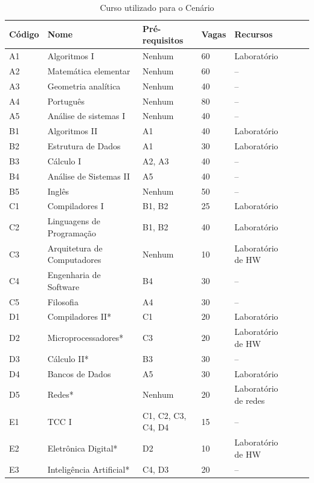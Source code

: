 \begin{table}\centering\footnotesize
  \caption{Curso utilizado para o Cenário}
  \begin{tabular*}{1\textwidth}{@{}lllllll@{}}
    \toprule
    Código & Nome & Pré-requisitos & Vagas & Recursos \\
    \midrule
    A1 & Algoritmos I           & Nenhum & 60 & Laboratório \\
    A2 & Matemática elementar   & Nenhum & 60 & -- \\
    A3 & Geometria analítica    & Nenhum & 40 & -- \\
    A4 & Português              & Nenhum & 80 & -- \\
    A5 & Análise de sistemas I  & Nenhum & 40 & -- \\
    \midrule
    B1 & Algoritmos II          & A1 & 40 & Laboratório \\
    B2 & Estrutura de Dados     & A1 & 30 & Laboratório \\
    B3 & Cálculo I              & A2, A3 & 40 & -- \\
    B4 & Análise de Sistemas II & A5 & 40 & -- \\
    B5 & Inglês                 & Nenhum & 50 & -- \\
    \midrule
    C1 & Compiladores I         & B1, B2 & 25 & Laboratório \\
    C2 & Linguagens de Programação & B1, B2 & 40 & Laboratório \\
    C3 & Arquitetura de Computadores & Nenhum & 10 & Laboratório de HW \\
    C4 & Engenharia de Software & B4 & 30 & -- \\
    C5 & Filosofia              & A4 & 30 & -- \\
    \midrule
    D1 & Compiladores II*       & C1 & 20 & Laboratório \\
    D2 & Microprocessadores*    & C3 & 20 & Laboratório de HW \\
    D3 & Cálculo II*            & B3 & 30 & -- \\
    D4 & Bancos de Dados        & A5 & 30 & Laboratório \\
    D5 & Redes*                 & Nenhum & 20 & Laboratório de redes \\
    \midrule
    E1 & TCC I                  & C1, C2, C3, C4, D4 & 15 & -- \\
    E2 & Eletrônica Digital*    & D2 & 10 & Laboratório de HW \\
    E3 & Inteligência Artificial* & C4, D3 & 20 & -- \\

\end{tabular*}
\end{table}
